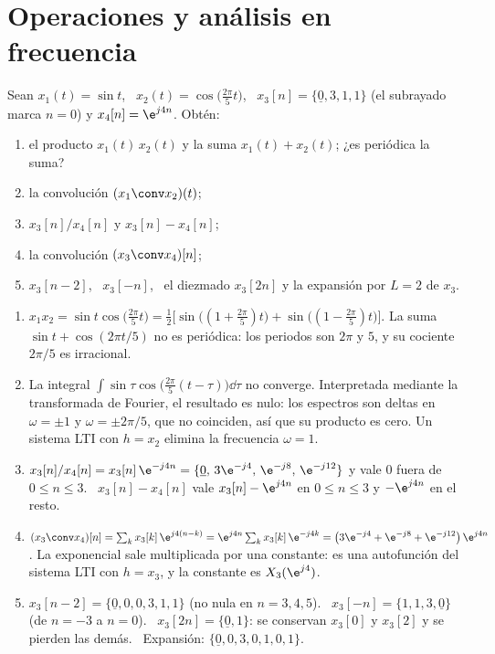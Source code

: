 \documentclass[11pt,a4paper]{scrartcl}
\begin{document}
\section*{Operaciones y análisis en frecuencia}

\begin{ejercicio}[operaciones]
  Sean $x_1(t)=\sin t$, \ $x_2(t)=\cos\big(\tfrac{2\pi}{5}t\big)$, \ $x_3[n]=\{\underline{0},3,1,1\}$ (el subrayado marca $n=0$) y $x_4[n]=\e^{j4n}$. Obtén:
  \begin{enumerate}[label=\alph*)]
    \item el producto $x_1(t)\,x_2(t)$ y la suma $x_1(t)+x_2(t)$; ¿es periódica la suma?
    \item la convolución $(x_1\conv x_2)(t)$;
    \item $x_3[n]/x_4[n]$ y $x_3[n]-x_4[n]$;
    \item la convolución $(x_3\conv x_4)[n]$;
    \item $x_3[n-2]$, \ $x_3[-n]$, \ el diezmado $x_3[2n]$ y la expansión por $L=2$ de $x_3$.
  \end{enumerate}
\end{ejercicio}
\begin{solucion}
  \begin{enumerate}[label=\alph*)]
    \item $x_1x_2=\sin t\cos\big(\tfrac{2\pi}{5}t\big)=\tfrac12\Big[\sin\big((1+\tfrac{2\pi}{5})t\big)+\sin\big((1-\tfrac{2\pi}{5})t\big)\Big]$. La suma $\sin t+\cos(2\pi t/5)$ no es periódica: los periodos son $2\pi$ y $5$, y su cociente $2\pi/5$ es irracional.
    \item La integral $\int\sin\tau\cos\big(\tfrac{2\pi}{5}(t-\tau)\big)\dd\tau$ no converge. Interpretada mediante la transformada de Fourier, el resultado es nulo: los espectros son deltas en $\omega=\pm1$ y $\omega=\pm2\pi/5$, que no coinciden, así que su producto es cero. Un sistema LTI con $h=x_2$ elimina la frecuencia $\omega=1$.
    \item $x_3[n]/x_4[n]=x_3[n]\,\e^{-j4n}=\{\underline{0},\,3\e^{-j4},\,\e^{-j8},\,\e^{-j12}\}$ y vale $0$ fuera de $0\le n\le3$. \ $x_3[n]-x_4[n]$ vale $x_3[n]-\e^{j4n}$ en $0\le n\le3$ y $-\e^{j4n}$ en el resto.
    \item $(x_3\conv x_4)[n]=\sum_kx_3[k]\,\e^{j4(n-k)}=\e^{j4n}\sum_kx_3[k]\,\e^{-j4k}=\big(3\e^{-j4}+\e^{-j8}+\e^{-j12}\big)\,\e^{j4n}$. La exponencial sale multiplicada por una constante: es una autofunción del sistema LTI con $h=x_3$, y la constante es $X_3(\e^{j4})$.
    \item $x_3[n-2]=\{\underline{0},0,0,3,1,1\}$ (no nula en $n=3,4,5$). \ $x_3[-n]=\{1,1,3,\underline{0}\}$ (de $n=-3$ a $n=0$). \ $x_3[2n]=\{\underline{0},1\}$: se conservan $x_3[0]$ y $x_3[2]$ y se pierden las demás. \ Expansión: $\{\underline{0},0,3,0,1,0,1\}$.
  \end{enumerate}
\end{solucion}
\end{document}
